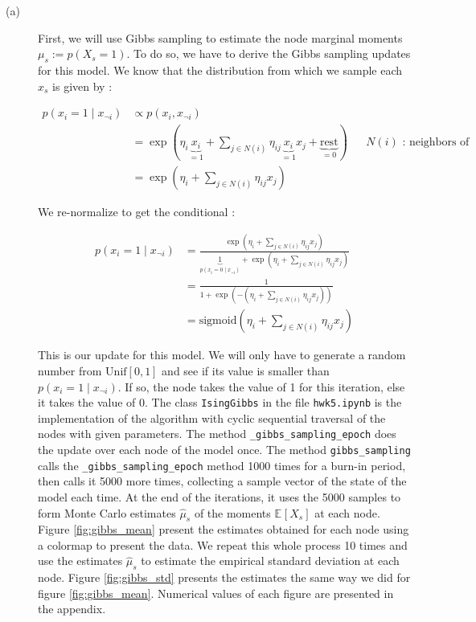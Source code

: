 \documentclass[11pt]{article}
\newcommand{\Expect}[2][]{\mathbb{E}_{#1}\!\left[#2 \right]}
\newcommand{\sigmoid}[1]{\mathrm{sigmoid}\left(#1 \right)}
\begin{document}
\begin{description}
\item [(a)]

First, we will use Gibbs sampling to estimate the node marginal moments $\mu_s := p(X_s = 1)$. To do so, we have to derive the Gibbs sampling updates for this model. We know that the distribution from which we sample each $x_s$ is given by : 

\begin{align*}
p(x_i = 1 \mid x_{\neg i} ) & \propto p\left(x_i, x_{\neg i}\right) \\
							& = \exp \left( \eta_i \underbrace{x_i}_{=1} + \sum_{j \in N(i)} \eta_{ij} \underbrace{x_i}_{=1} x_j + \underbrace{\mathrm{rest}}_{=0} \right) && N(i) \text{ : neighbors of node i} \\
							& = \exp \left( \eta_i + \sum_{j \in N(i)} \eta_{ij} x_j\right)
\end{align*}

We re-normalize to get the conditional :

\begin{align*}
p(x_i=1\mid x_{\neg i}) & = \frac{\exp \left( \eta_i + \sum_{j \in N(i)} \eta_{ij} x_j\right)}{\underbrace{1}_{p(x_i=0\mid x_{\neg i})} + \exp \left( \eta_i + \sum_{j \in N(i)} \eta_{ij} x_j\right)}\\
						& = \frac{1}{1 + \exp \left(-( \eta_i + \sum_{j \in N(i)} \eta_{ij} x_j)\right)} \\
						& = \sigmoid{\eta_i + \sum_{j \in N(i)} \eta_{ij} x_j}
\end{align*}

This is our update for this model. We will only have to generate a random number from $\text{Unif}[0,1]$ and see if its value is smaller than $p(x_i=1\mid x_{\neg i})$. If so, the node takes the value of 1 for this iteration, else it takes the value of 0. The class \texttt{IsingGibbs} in the file \texttt{hwk5.ipynb} is the implementation of the algorithm with cyclic sequential traversal of the nodes with given parameters. The method \texttt{\_gibbs\_sampling\_epoch} does the update over each node of the model once. The method \texttt{gibbs\_sampling} calls the \texttt{\_gibbs\_sampling\_epoch} method 1000 times for a burn-in period, then calls it 5000 more times, collecting a sample vector of the state of the model each time. At the end of the iterations, it uses the 5000 samples to form Monte Carlo estimates $\hat{\mu}_s$ of the moments $\Expect{X_s}$ at each node. Figure \ref{fig:gibbs_mean} present the estimates obtained for each node using a colormap to present the data. We repeat this whole process 10 times and use the estimates $\hat{\mu}_s$ to estimate the empirical standard deviation at each node. Figure \ref{fig:gibbs_std} presents the estimates the same way we did for figure \ref{fig:gibbs_mean}. Numerical values of each figure are presented in the appendix.


\end{description}
\end{document}
